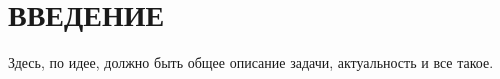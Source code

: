 \newpage
\section*{\hfil ВВЕДЕНИЕ \hfil}
	Здесь, по идее, должно быть общее описание задачи, актуальность и все такое.